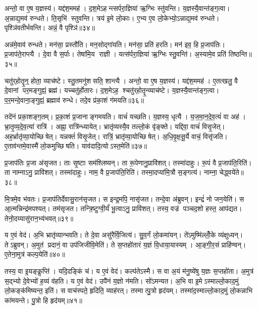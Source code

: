 अन्तो॒ वा ए॒ष य॒ज्ञस्य॑।
यद्द॑श॒ममह॑।
द॒श॒मेऽहन्त्सर्परा॒ज्ञिया॑ ऋ॒ग्भिः स्तु॑वन्ति।
य॒ज्ञस्यै॒वान्त॑ङ्ग॒त्वा।
अ॒न्नाद्य॒मव॑ रुन्धते।
ति॒सृभि॑ स्तुवन्ति।
त्रय॑ इ॒मे लो॒काः।
ए॒भ्य ए॒व लो॒केभ्यो॒ऽन्नाद्य॒मव॑ रुन्धते।
पृश्ञि॑वतीर्भवन्ति।
अन्नं॒ वै पृश्ञि॑॥३४॥

अन्न॑मे॒वाव॑ रुन्धते।
मन॑सा॒ प्रस्तौ॑ति।
मन॒सोद्गा॑यति।
मन॑सा॒ प्रति॑ हरति।
मन॑ इव॒ हि प्र॒जाप॑तिः।
प्र॒जाप॑ते॒राप्त्यै।
दे॒वा वै स॒र्पाः।
तेषा॑मि॒य राज्ञी।
यत्स॑र्परा॒ज्ञिया॑ ऋ॒ग्भिः स्तु॒वन्ति॑।
अ॒स्यामे॒व प्रति॑ तिष्ठन्ति॥३५॥

चतु॑र्‌होतॄ॒न्॒ होता॒ व्याच॑ष्टे।
स्तु॒तमनु॑शसति॒ शान्त्यै।
अन्तो॒ वा ए॒ष य॒ज्ञस्य॑।
यद्द॑श॒ममह॑।
ए॒तत्खलु॒ वै दे॒वानां पर॒मङ्गुह्यं॒ ब्रह्म॑।
यच्चतु॑र्होतारः।
द॒श॒मेऽह॒ श्चतु॑र्‌होतॄ॒न्व्याच॑ष्टे।
य॒ज्ञस्यै॒वान्त॑ङ्ग॒त्वा।
प॒र॒मन्दे॒वाना॒ङ्गुह्यं॒ ब्रह्माव॑ रुन्धे।
तदे॒व प्र॑का॒शं ग॑मयति॥३६॥

तदे॑नं प्रका॒शङ्ग॒तम्।
प्र॒का॒शं प्र॒जानाङ्गमयति।
वाचं॑ यच्छति।
य॒ज्ञस्य॒ धृत्यै।
य॒ज॒मा॒न॒दे॒व॒त्यं॑ वा अह॑।
भ्रा॒तृ॒व्य॒दे॒व॒त्या॑ रात्रि॑।
अह्ना॒ रात्रि॑न्ध्यायेत्।
भ्रातृ॑व्यस्यै॒व तल्लो॒कं वृ॑ङ्क्ते।
यद्दिवा॒ वाचं॑ विसृ॒जेत्।
अह॒र्भ्रातृ॑व्या॒योच्छिषेत्।
यन्नक्तं॑ विसृ॒जेत्।
रात्रिं॒ भ्रातृ॑व्या॒योच्छिषेत्।
अ॒धि॒वृ॒क्ष॒सू॒र्ये वाचं॒ विसृ॑जति।
ए॒ताव॑न्तमे॒वास्मै॑ लो॒कमुच्छिषति।
याव॑दादि॒त्योऽस्त॒मेति॑॥३७॥\anuvakamend[पृश्ञि॑ तिष्ठन्ति गमयति शिषे॒त्पञ्च॑ च]

प्र॒जाप॑तिः प्र॒जा अ॑सृजत।
ताः सृ॒ष्टाः सम॑श्लिष्यन्।
ता रू॒पेणानु॒प्रावि॑शत्।
तस्मा॑दाहुः।
रू॒पं वै प्र॒जाप॑ति॒रिति॑।
ता नाम्नाऽनु॒ प्रावि॑शत्।
तस्मा॑दाहुः।
नाम॒ वै प्र॒जाप॑ति॒रिति॑।
तस्मा॒दप्या॑मि॒त्रौ स॒ङ्गत्य॑।
नाम्ना॒ चेद्ध्वये॑ते॥३८॥

मि॒त्रमे॒व भ॑वतः।
प्र॒जाप॑तिर्देवासु॒रान॑सृजत।
स इन्द्र॒मपि॒ नासृ॑जत।
तन्दे॒वा अ॑ब्रुवन्।
इन्द्रं॑ नो जन॒येति॑।
स आ॒त्मन्निन्द्र॑मपश्यत्।
तम॑सृजत।
तन्त्रि॒ष्टुग्वी॒र्यं॑ भू॒त्वाऽनु॒ प्रावि॑शत्।
तस्य॒ वज्र॑ पञ्चद॒शो हस्त॒ आप॑द्यत।
तेनो॒दय्यासु॑रान॒भ्य॑भवत्॥३९॥

य ए॒वं वेद॑।
अ॒भि भ्रातृ॑व्यान्भवति।
ते दे॒वा असु॑रैर्वि॒जित्य॑।
सु॒व॒र्गं लो॒कमा॑यन्।
ते॑ऽमुष्मि॑ल्लोँ॒के व्य॑क्षुध्यन्।
तेऽब्रुवन्।
अ॒मुत॑ प्रदानं॒ वा उप॑जिजीवि॒मेति॑।
ते स॒प्तहो॑तारं य॒ज्ञं वि॒धाया॒यास्यम्।
आ॒ङ्गी॒र॒सं प्राहि॑ण्वन्।
ए॒तेना॒मुत्र॑ कल्प॒येति॑॥४०॥

तस्य॒ वा इ॒यङ्कॢप्ति॑।
यदि॒दङ्किं च॑।
य ए॒वं वेद॑।
कल्प॑तेऽस्मै।
स वा अ॒यं म॑नु॒ष्ये॑षु य॒ज्ञः स॒प्तहो॑ता।
अ॒मुत्र॑ स॒द्भ्यो दे॒वेभ्यो॑ ह॒व्यं व॑हति।
य ए॒वं वेद॑।
उपै॑नं य॒ज्ञो न॑मति।
सो॑ऽमन्यत।
अ॒भि वा इ॒मेऽस्माल्लो॒काद॒मुं लो॒कङ्क॑मिष्यन्त॒ इति॑।
स वाच॑स्पते॒ हृदिति॒ व्याह॑रत्।
तस्मात्पु॒त्रो हृद॑यम्।
तस्मा॑द॒स्माल्लो॒काद॒मुं लो॒कन्नाभि का॑मयन्ते।
पु॒त्रो हि हृद॑यम्॥४१॥\anuvakamend[ह्वये॑ते अभवत्कल्प॒येतीति॑ च॒त्वारि॑ च]

